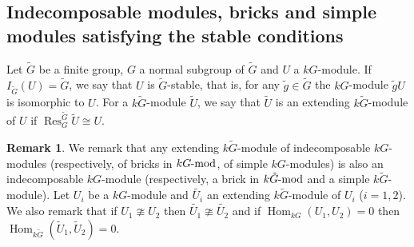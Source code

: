 \documentclass[pdftex,a4paper]{article}
\numberwithin{equation}{subsection}
\theoremstyle{definition}
\newtheorem{remark}[theorem]{Remark}
\newcommand{\lmod}{\operatorname{\mathrm{\hspace{-2pt}-mod}}}
\newcommand{\Hom}{\operatorname{Hom}\nolimits}
\newcommand{\restr}{{\operatorname{Res}\nolimits}}
\newcommand{\decompgp}{I}
\begin{document}
\subsection{Indecomposable modules, bricks and simple modules satisfying the stable conditions}
Let \(\tilde{G}\) be a finite group, \(G\) a normal subgroup of \(\tilde{G}\) and \(U\) a \(kG\)-module.
If \(\decompgp_{\tilde{G}}(U)={\tilde{G}}\), we say that \(U\) is \({\tilde{G}}\)-stable, that is, for any \(\tilde{g}\in \tilde{G}\) the \(kG\)-module \(\tilde{g}U\) is isomorphic to \(U\).
For a \(k\tilde{G}\)-module \(\tilde{U}\), we say that \(\tilde{U}\) is an extending \(k\tilde{G}\)-module of \(U\) if \(\restr_G^{\tilde{G}} \tilde{U}\cong U\).
\begin{remark}\label{rem extending action hom}
	We remark that any extending \(k\tilde{G}\)-module of indecomposable \(kG\)-modules (respectively, of  bricks in \(kG\lmod\), of simple \(kG\)-modules) is also an indecomposable \(kG\)-module (respectively, a brick in \(k\tilde{G}\lmod\) and a simple \(k\tilde{G}\)-module).
	Let \(U_i\) be a \(kG\)-module and \(\tilde{U_i}\) an extending \(k\tilde{G}\)-module of \(U_i\) (\(i=1, 2\)).
	We also remark that if \(U_1\ncong U_2\) then \(\tilde{U_1}\ncong \tilde{U_2}\) and if \(\Hom_{kG}(U_1,U_2)=0\) then \(\Hom_{k\tilde{G}}(\tilde{U}_1,\tilde{U}_2)=0\).
\end{remark}
\end{document}
